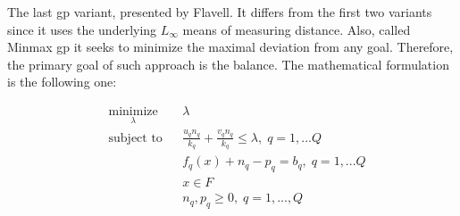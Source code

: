 \begin{doublespace}
The last \gls{gp} variant, presented by Flavell\cite{Flavell1976}. It differs from the first two variants since it uses the underlying $ L_\infty $ means of measuring distance. Also, called Minmax \gls{gp} it seeks to minimize the maximal deviation from any goal. Therefore, the primary goal of such approach is the balance. The mathematical formulation is the following one:

\begin{equation*}
\begin{aligned}
& \underset{\lambda}{\text{minimize}}
& & \lambda \\
& \text{subject to}
& & \frac{u_q n_q}{k_q}+\frac{v_q n_q}{k_q}\leq\lambda, \; q=1,...Q \\
& & & f_q(x)+n_q-p_q=b_q, \; q=1,...Q \\
& & & x\in F \\
& & & n_q,p_q\geq 0, \; q=1,...,Q 
\end{aligned}
\end{equation*}

\end{doublespace}
\clearpage{\pagestyle{empty}\cleardoublepage}
